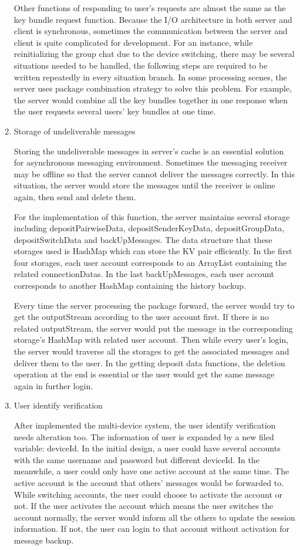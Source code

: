 \begin{enumerate}[label=(\roman*)]
Other functions of responding to user's requests are almost the same as the key bundle request function. Because the I/O architecture in both server and client is synchronous, sometimes the communication between the server and client is quite complicated for development. For an instance, while reinitializing the group chat due to the device switching, there may be several situations needed to be handled, the following steps are required to be written repeatedly in every situation branch. In some processing scenes, the server uses package combination strategy to solve this problem. For example, the server would combine all the key bundles together in one response when the user requests several users' key bundles at one time.

\item Storage of undeliverable messages

Storing the undeliverable messages in server's cache is an essential solution for asynchronous messaging environment. Sometimes the messaging receiver may be offline so that the server cannot deliver the messages correctly. In this situation, the server would store the messages until the receiver is online again, then send and delete them.

For the implementation of this function, the server maintains several storage including depositPairwiseData, depositSenderKeyData, depositGroupData, depositSwitchData and backUpMessages. The data structure that these storages used is HashMap which can store the KV pair efficiently. In the first four storages, each user account corresponds to an ArrayList containing the related connectionDatas. In the last backUpMessages, each user account corresponds to another HashMap containing the history backup.

Every time the server processing the package forward, the server would try to get the outputStream according to the user account first. If there is no related outputStream, the server would put the message in the corresponding storage's HashMap with related user account. Then while every user's login, the server would traverse all the storages to get the associated messages and deliver them to the user. In the getting deposit data functions, the deletion operation at the end is essential or the user would get the same message again in further login.

\item User identify verification

After implemented the multi-device system, the user identify verification needs alteration too. The information of user is expanded by a new filed variable: deviceId. In the initial design, a user could have several accounts with the same username and password but different deviceId. In the meanwhile, a user could only have one active account at the same time. The active account is the account that others' messages would be forwarded to. While switching accounts, the user could choose to activate the account or not. If the user activates the account which means the user switches the account normally, the server would inform all the others to update the session information. If not, the user can login to that account without activation for message backup.


\end{enumerate}
